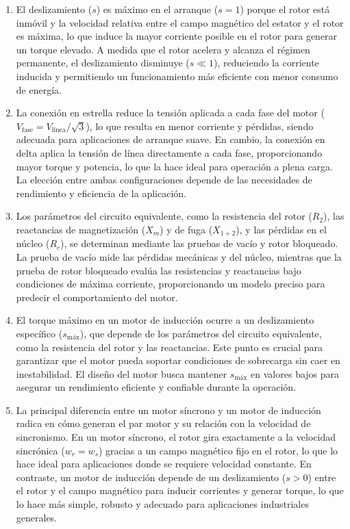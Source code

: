 \documentclass[
  11pt,
  letterpaper,
   addpoints,
   answers
  ]{exam}
\begin{document}
\begin{questions}
\begin{solution}
\begin{enumerate}
            \item El deslizamiento (\(s\)) es máximo en el arranque (\(s = 1\)) porque el rotor está inmóvil y la velocidad relativa entre el campo magnético del estator y el rotor es máxima, lo que induce la mayor corriente posible en el rotor para generar un torque elevado. A medida que el rotor acelera y alcanza el régimen permanente, el deslizamiento disminuye (\(s \ll 1\)), reduciendo la corriente inducida y permitiendo un funcionamiento más eficiente con menor consumo de energía.
        
            \item La conexión en estrella reduce la tensión aplicada a cada fase del motor (\(V_\text{fase} = V_\text{línea} / \sqrt{3}\)), lo que resulta en menor corriente y pérdidas, siendo adecuada para aplicaciones de arranque suave. En cambio, la conexión en delta aplica la tensión de línea directamente a cada fase, proporcionando mayor torque y potencia, lo que la hace ideal para operación a plena carga. La elección entre ambas configuraciones depende de las necesidades de rendimiento y eficiencia de la aplicación.
        
            \item Los parámetros del circuito equivalente, como la resistencia del rotor (\(R_2\)), las reactancias de magnetización (\(X_m\)) y de fuga (\(X_{1+2}\)), y las pérdidas en el núcleo (\(R_c\)), se determinan mediante las pruebas de vacío y rotor bloqueado. La prueba de vacío mide las pérdidas mecánicas y del núcleo, mientras que la prueba de rotor bloqueado evalúa las resistencias y reactancias bajo condiciones de máxima corriente, proporcionando un modelo preciso para predecir el comportamiento del motor.
        
            \item El torque máximo en un motor de inducción ocurre a un deslizamiento específico (\(s_\text{máx}\)), que depende de los parámetros del circuito equivalente, como la resistencia del rotor y las reactancias. Este punto es crucial para garantizar que el motor pueda soportar condiciones de sobrecarga sin caer en inestabilidad. El diseño del motor busca mantener \(s_\text{máx}\) en valores bajos para asegurar un rendimiento eficiente y confiable durante la operación.
        
            \item La principal diferencia entre un motor síncrono y un motor de inducción radica en cómo generan el par motor y su relación con la velocidad de sincronismo. En un motor síncrono, el rotor gira exactamente a la velocidad sincrónica (\(w_r = w_s\)) gracias a un campo magnético fijo en el rotor, lo que lo hace ideal para aplicaciones donde se requiere velocidad constante. En contraste, un motor de inducción depende de un deslizamiento (\(s > 0\)) entre el rotor y el campo magnético para inducir corrientes y generar torque, lo que lo hace más simple, robusto y adecuado para aplicaciones industriales generales.
        \end{enumerate}


\end{solution}
\end{questions}
\end{document}
